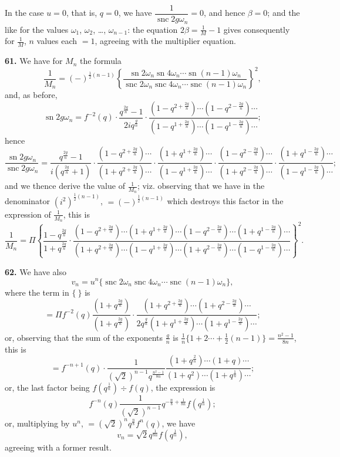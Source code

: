 \documentclass[12pt,a4paper]{article}
\DeclareMathOperator{\sn}{sn}
\DeclareMathOperator{\snc}{snc}
\begin{document}
In the case $u = 0$, that is, $q = 0$, we have $\dfrac{1}{\snc 2g\omega_n} = 0$, and hence $\beta = 0$; and the like for the values $\omega_1$, $\omega_2$, \ldots, $\omega_{n-1}$: the equation $2\beta = \frac{1}{M} - 1$ gives consequently for $\frac{1}{M}$, $n$ values each $= 1$, agreeing with the multiplier equation.

\textbf{61.} We have for $M_n$ the formula
\[
\frac{1}{M_n} = (-)^{\frac{1}{2}(n-1)}
\left\{\frac{\sn 2\omega_n \sn 4\omega_n \cdots \sn (n-1)\omega_n}
{\snc 2\omega_n \snc 4\omega_n \cdots \snc (n-1)\omega_n}\right\}^2,
\]
and, as before,
\[
\sn 2g\omega_n = f^{-2}(q) \cdot
\frac{q^{\frac{2g}{n}} - 1}{2iq^{\frac{g}{n}}} \cdot
\frac{(1 - q^{2 + \frac{2g}{n}}) \cdots (1 - q^{2 - \frac{2g}{n}}) \cdots}
{(1 - q^{1 + \frac{2g}{n}}) \cdots (1 - q^{1 - \frac{2g}{n}}) \cdots};
\]
hence
\[
\frac{\sn 2g\omega_n}{\snc 2g\omega_n}
= \frac{q^{\frac{2g}{n}} - 1}{i(q^{\frac{2g}{n}} + 1)} \cdot
\frac{(1 - q^{2 + \frac{2g}{n}}) \cdots}{(1 + q^{2 + \frac{2g}{n}}) \cdots} \cdot
\frac{(1 + q^{1 + \frac{2g}{n}}) \cdots}{(1 - q^{1 + \frac{2g}{n}}) \cdots} \cdot
\frac{(1 - q^{2 - \frac{2g}{n}}) \cdots}{(1 + q^{2 - \frac{2g}{n}}) \cdots} \cdot
\frac{(1 + q^{1 - \frac{2g}{n}}) \cdots}{(1 - q^{1 - \frac{2g}{n}}) \cdots};
\]
and we thence derive the value of $\frac{1}{M_n}$; viz. observing that we have in the denominator $(i^2)^{\frac{1}{2}(n-1)}$, $= (-)^{\frac{1}{2}(n-1)}$ which destroys this factor in the expression of $\frac{1}{M_n}$, this is
\[
\frac{1}{M_n} = \Pi \left\{
\frac{1 - q^{\frac{2g}{n}}}{1 + q^{\frac{2g}{n}}} \cdot
\frac{(1 - q^{2 + \frac{2g}{n}}) \cdots (1 + q^{1 + \frac{2g}{n}}) \cdots
(1 - q^{2 - \frac{2g}{n}}) \cdots (1 + q^{1 - \frac{2g}{n}}) \cdots}
{(1 + q^{2 + \frac{2g}{n}}) \cdots (1 - q^{1 + \frac{2g}{n}}) \cdots
(1 + q^{2 - \frac{2g}{n}}) \cdots (1 - q^{1 - \frac{2g}{n}}) \cdots}
\right\}^2.
\]




\textbf{62.} We have also
\[
v_n = u^n\{\snc 2\omega_n \snc 4\omega_n \cdots \snc (n-1)\omega_n\},
\]
where the term in $\{~\}$ is
\[
= \Pi f^{-2}(q) \frac{(1 + q^{\frac{2g}{n}})}{(1 + q^{\frac{2g}{n}})} \cdot
\frac{(1 + q^{2 + \frac{2g}{n}}) \cdots (1 + q^{2 - \frac{2g}{n}}) \cdots}
{2q^{\frac{g}{n}}(1 + q^{1 + \frac{2g}{n}}) \cdots (1 + q^{1 - \frac{2g}{n}}) \cdots};
\]
or, observing that the sum of the exponents $\frac{g}{n}$ is $\frac{1}{n}\{1 + 2 \cdots + \frac{1}{2}(n-1)\} = \frac{n^2 - 1}{8n}$, this is
\[
= f^{-n+1}(q) \cdot \frac{1}{(\sqrt{2})^{n-1} q^{\frac{n^2 - 1}{8n}}}
\frac{(1 + q^{\frac{2}{n}}) \cdots (1 + q) \cdots}
{(1 + q^2) \cdots (1 + q^{\frac{1}{n}}) \cdots};
\]
or, the last factor being $f(q^{\frac{1}{n}}) \div f(q)$, the expression is
\[
f^{-n}(q) \frac{1}{(\sqrt{2})^{n-1}} q^{-\frac{n}{8} + \frac{1}{8n}} f(q^{\frac{1}{n}});
\]
or, multiplying by $u^n$, $= (\sqrt{2})^n q^{\frac{n}{8}} f^n(q)$, we have
\[
v_n = \sqrt{2} q^{\frac{1}{8n}} f(q^{\frac{1}{n}}),
\]
agreeing with a former result.
\end{document}
